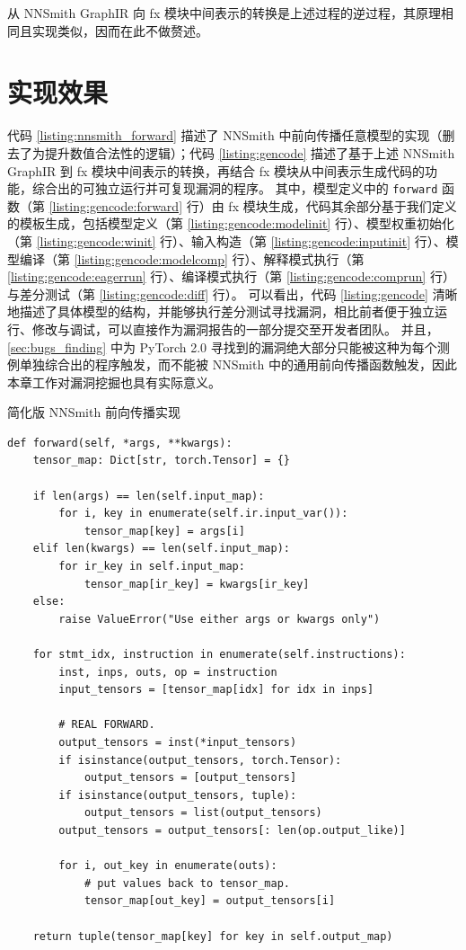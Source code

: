 从 NNSmith GraphIR 向 fx 模块中间表示的转换是上述过程的逆过程，其原理相同且实现类似，因而在此不做赘述。

\section{实现效果}

代码 \ref{listing:nnsmith_forward} 描述了 NNSmith 中前向传播任意模型的实现（删去了为提升数值合法性的逻辑）；代码 \ref{listing:gencode} 描述了基于上述 NNSmith GraphIR 到 fx 模块中间表示的转换，再结合 fx 模块从中间表示生成代码的功能，综合出的可独立运行并可复现漏洞的程序。
其中，模型定义中的 \texttt{forward} 函数（第 \ref{listing:gencode:forward} 行）由 fx 模块生成，代码其余部分基于我们定义的模板生成，包括模型定义（第 \ref{listing:gencode:modelinit} 行）、模型权重初始化（第 \ref{listing:gencode:winit} 行）、输入构造（第 \ref{listing:gencode:inputinit} 行）、模型编译（第 \ref{listing:gencode:modelcomp} 行）、解释模式执行（第 \ref{listing:gencode:eagerrun} 行）、编译模式执行（第 \ref{listing:gencode:comprun} 行）与差分测试（第 \ref{listing:gencode:diff} 行）。
可以看出，代码 \ref{listing:gencode} 清晰地描述了具体模型的结构，并能够执行差分测试寻找漏洞，相比前者便于独立运行、修改与调试，可以直接作为漏洞报告的一部分提交至开发者团队。
并且，\ref{sec:bugs_finding} 中为 PyTorch 2.0 寻找到的漏洞绝大部分只能被这种为每个测例单独综合出的程序触发，而不能被 NNSmith 中的通用前向传播函数触发，因此本章工作对漏洞挖掘也具有实际意义。

\begin{listing}[]
    \caption{简化版 NNSmith 前向传播实现}
    \label{listing:nnsmith_forward}
\begin{verbatim}
def forward(self, *args, **kwargs):
    tensor_map: Dict[str, torch.Tensor] = {}

    if len(args) == len(self.input_map):
        for i, key in enumerate(self.ir.input_var()):
            tensor_map[key] = args[i]
    elif len(kwargs) == len(self.input_map):
        for ir_key in self.input_map:
            tensor_map[ir_key] = kwargs[ir_key]
    else:
        raise ValueError("Use either args or kwargs only")

    for stmt_idx, instruction in enumerate(self.instructions):
        inst, inps, outs, op = instruction
        input_tensors = [tensor_map[idx] for idx in inps]

        # REAL FORWARD.
        output_tensors = inst(*input_tensors)
        if isinstance(output_tensors, torch.Tensor):
            output_tensors = [output_tensors]
        if isinstance(output_tensors, tuple):
            output_tensors = list(output_tensors)
        output_tensors = output_tensors[: len(op.output_like)]

        for i, out_key in enumerate(outs):
            # put values back to tensor_map.
            tensor_map[out_key] = output_tensors[i]
            
    return tuple(tensor_map[key] for key in self.output_map)
\end{verbatim}
\end{listing}

